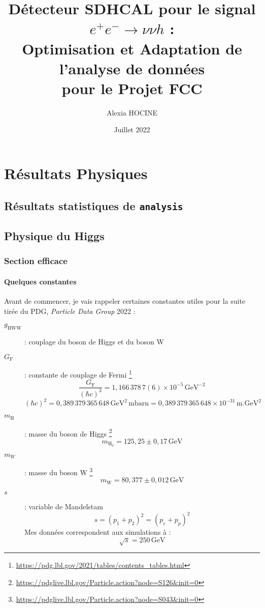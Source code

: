 \documentclass[10pt,a4paper]{report}
\author{Alexia \textsc{HOCINE}}
\title{
	Détecteur SDHCAL pour le signal  $ e^{+} e^{-} \longrightarrow \nu \nu h $ :\\
	Optimisation et Adaptation de l'analyse de données\\pour le Projet FCC 
}
\date{Juillet 2022}
\newcommand{\analysis}{\texttt{analysis}\xspace}
\newcommand{\GeV}{\mathrm{GeV}\xspace}
\newcommand{\mH}{m_\mathrm{H}}
\newcommand{\vhc}{0,389\,379\,365\,648} %
\newcommand{\GF}{G_\mathrm{F}}
\newcommand{\gHWW}{g_\mathrm{HWW}}
\begin{document}



%


\tableofcontents








\chapter{Résultats Physiques}

\section{Résultats statistiques de \analysis}



\section{Physique du Higgs}

\subsection{Section efficace}

\subsubsection{Quelques constantes}
Avant de commencer, je vais rappeler certaines constantes utiles pour la suite tirée du PDG, \textit{Particle Data Group} 2022\cite{Workman:2022ynf} :
\begin{description}

	\item[$\gHWW$] : couplage du boson de Higgs et du boson W

	\item[$\GF$] : constante de couplage de Fermi
	\footnote{\url{https://pdg.lbl.gov/2021/tables/contents_tables.html}}
	$$ \frac{G_\mathrm{F}}{\left(\hbar c\right)^3} = 1,166\,378\,7(6) \times 10^{-5}\, \GeV^{-2} $$
	$$ (\hbar c)^2 = \vhc \, \GeV^2 \, \mathrm{mbarn} = \vhc \times 10^{-31} \, \mathrm{m}.\GeV^2 $$
	
	\item[$\mH$] : masse du boson de Higgs
	\footnote{\url{https://pdglive.lbl.gov/Particle.action?node=S126&init=0}}
	$$ m_\mathrm{H_0} = 125,25 \pm 0,17 \, \GeV $$
		
	\item[$m_W$] : masse du boson W
	\footnote{\url{https://pdglive.lbl.gov/Particle.action?node=S043&init=0}}
	$$ m_\mathrm{W} = 80,377 \pm 0,012 \, \GeV $$
	
	\item[$s$] : variable de Mandelstam
	$$ s = \left(p_1 + p_2\right)^2 = \left(p_{e} + p_{p}\right)^2 $$
	Mes données correspondent aux simulations à : 
	$$ \sqrt{s} = 250\, \GeV $$

		
\end{description}
\end{document}
